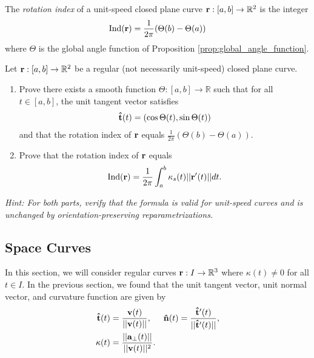 \documentclass[12pt,letterpaper,reqno]{article}
\numberwithin{equation}{section}
\newcommand{\R}{\ensuremath{\mathbb R}}
\newcommand{\bv}{{\bf v}}
\newcommand{\ba}{{\bf a}}
\newcommand{\bbr}{{\bf r}}
\newcommand{\ut}{{\bf {\hat{t}}}}
\newcommand{\un}{{\bf {\hat{n}}}}
\begin{document}
{\begin{defn}
	The \emph{rotation index} of a unit-speed closed plane curve $\bbr:[a,b] \to \R^2$  is the integer
	\begin{align*}
		\text{Ind}(\bbr)=\frac{1}{2\pi}(\Theta(b)-\Theta(a))
	\end{align*}
	where $\Theta$ is the global angle function of Proposition \ref{prop:global_angle_function}.
\end{defn}

\begin{exercise}
Let $\bbr:[a,b] \to \R^2$ be a regular (not necessarily unit-speed) closed plane curve.
\begin{enumerate}[(1)]
	\item Prove there exists a smooth function $\Theta:[a,b] \to \R$ such that for all $t \in [a,b]$, the unit tangent vector satisfies
	\begin{align*}
		\ut(t)=(\cos \Theta(t), \sin \Theta(t))
	\end{align*}
	and that the rotation index of $\bbr$ equals $\frac{1}{2\pi}(\Theta(b)-\Theta(a))$.
	\item Prove that the rotation index of $\bbr$ equals 
	\begin{align*}
		\text{Ind}(\bbr)=\frac{1}{2\pi}\int_a^b\kappa_s(t)||\bbr'(t)||dt.
	\end{align*}
\end{enumerate}	
\emph{Hint: For both parts, verify that the formula is valid for unit-speed curves and is unchanged by orientation-preserving reparametrizations.}
\end{exercise}

\begin{example}
	
\end{example}


\subsection{Space Curves}
In this section, we will consider regular curves $\bbr:I \to \R^3$ where $\kappa(t) \neq 0$ for all $t \in I$. In the previous section, we found that the unit tangent vector, unit normal vector, and curvature function are given by
	\begin{align*}
		\ut(t)&=\frac{\bv(t)}{||\bv(t)||}, \hspace{0.5cm} \un(t)=\frac{\ut'(t)}{||\ut'(t)||}, \\
		\kappa(t)&=\frac{||\ba_\perp(t)||}{||\bv(t)||^2}.
	\end{align*} 

}
\end{document}
